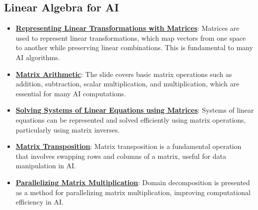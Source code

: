 \documentclass{article}%
\begin{document}
%
\subsection{Linear Algebra for AI}%
\label{subsec:LinearAlgebraforAI}%
\begin{itemize}[leftmargin=*]%
\item \href{\url{https://purdue.brightspace.com/d2l/common/assets/pdfjs-d2l-dist/1.0.14-legacy/web/viewer.html?file=\%252Fcontent\%252Fenforced\%252F1095467-wl.202510.CS.24300.001\%252F04L1-Linear\%20Algebra\%20Primer.pdf\%253Fou\%253D1095467\&lang=en-us\&container=d2l-fileviewer-rendered-pdf\&fullscreen=d2l-fileviewer-rendered-pdf-dialog\&height=667}#page=5}{\textbf{Representing Linear Transformations with Matrices}}: Matrices are used to represent linear transformations, which map vectors from one space to another while preserving linear combinations. This is fundamental to many AI algorithms.%
\item \href{\url{https://purdue.brightspace.com/d2l/common/assets/pdfjs-d2l-dist/1.0.14-legacy/web/viewer.html?file=\%252Fcontent\%252Fenforced\%252F1095467-wl.202510.CS.24300.001\%252F04L1-Linear\%20Algebra\%20Primer.pdf\%253Fou\%253D1095467\&lang=en-us\&container=d2l-fileviewer-rendered-pdf\&fullscreen=d2l-fileviewer-rendered-pdf-dialog\&height=667}#page=9}{\textbf{Matrix Arithmetic}}: The slide covers basic matrix operations such as addition, subtraction, scalar multiplication, and multiplication, which are essential for many AI computations.%
\item \href{\url{https://purdue.brightspace.com/d2l/common/assets/pdfjs-d2l-dist/1.0.14-legacy/web/viewer.html?file=\%252Fcontent\%252Fenforced\%252F1095467-wl.202510.CS.24300.001\%252F04L1-Linear\%20Algebra\%20Primer.pdf\%253Fou\%253D1095467\&lang=en-us\&container=d2l-fileviewer-rendered-pdf\&fullscreen=d2l-fileviewer-rendered-pdf-dialog\&height=667}#page=11}{\textbf{Solving Systems of Linear Equations using Matrices}}: Systems of linear equations can be represented and solved efficiently using matrix operations, particularly using matrix inverses.%
\item \href{\url{https://purdue.brightspace.com/d2l/common/assets/pdfjs-d2l-dist/1.0.14-legacy/web/viewer.html?file=\%252Fcontent\%252Fenforced\%252F1095467-wl.202510.CS.24300.001\%252F04L1-Linear\%20Algebra\%20Primer.pdf\%253Fou\%253D1095467\&lang=en-us\&container=d2l-fileviewer-rendered-pdf\&fullscreen=d2l-fileviewer-rendered-pdf-dialog\&height=667}#page=16}{\textbf{Matrix Transposition}}: Matrix transposition is a fundamental operation that involves swapping rows and columns of a matrix, useful for data manipulation in AI.%
\item \href{\url{https://purdue.brightspace.com/d2l/common/assets/pdfjs-d2l-dist/1.0.14-legacy/web/viewer.html?file=\%252Fcontent\%252Fenforced\%252F1095467-wl.202510.CS.24300.001\%252F04L1-Linear\%20Algebra\%20Primer.pdf\%253Fou\%253D1095467\&lang=en-us\&container=d2l-fileviewer-rendered-pdf\&fullscreen=d2l-fileviewer-rendered-pdf-dialog\&height=667}#page=18}{\textbf{Parallelizing Matrix Multiplication}}: Domain decomposition is presented as a method for parallelizing matrix multiplication, improving computational efficiency in AI.%
\end{itemize}
\end{document}
